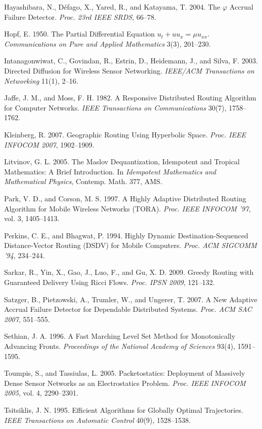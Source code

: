\documentclass[11pt]{article}
\theoremstyle{plain}
\numberwithin{equation}{section}
\begin{document}
Hayashibara, N., Défago, X., Yared, R., and Katayama, T. 2004. The $\varphi$ Accrual Failure Detector. \emph{Proc. 23rd IEEE SRDS}, 66–78.

Hopf, E. 1950. The Partial Differential Equation $u_t + u u_x = \mu u_{xx}$. \emph{Communications on Pure and Applied Mathematics} 3(3), 201–230.

Intanagonwiwat, C., Govindan, R., Estrin, D., Heidemann, J., and Silva, F. 2003. Directed Diffusion for Wireless Sensor Networking. \emph{IEEE/ACM Transactions on Networking} 11(1), 2–16.

Jaffe, J. M., and Moss, F. H. 1982. A Responsive Distributed Routing Algorithm for Computer Networks. \emph{IEEE Transactions on Communications} 30(7), 1758–1762.

Kleinberg, R. 2007. Geographic Routing Using Hyperbolic Space. \emph{Proc. IEEE INFOCOM 2007}, 1902–1909.

Litvinov, G. L. 2005. The Maslov Dequantization, Idempotent and Tropical Mathematics: A Brief Introduction. In \emph{Idempotent Mathematics and Mathematical Physics}, Contemp. Math. 377, AMS.

Park, V. D., and Corson, M. S. 1997. A Highly Adaptive Distributed Routing Algorithm for Mobile Wireless Networks (TORA). \emph{Proc. IEEE INFOCOM '97}, vol. 3, 1405–1413.

Perkins, C. E., and Bhagwat, P. 1994. Highly Dynamic Destination-Sequenced Distance-Vector Routing (DSDV) for Mobile Computers. \emph{Proc. ACM SIGCOMM '94}, 234–244.

Sarkar, R., Yin, X., Gao, J., Luo, F., and Gu, X. D. 2009. Greedy Routing with Guaranteed Delivery Using Ricci Flows. \emph{Proc. IPSN 2009}, 121–132.

Satzger, B., Pietzowski, A., Trumler, W., and Ungerer, T. 2007. A New Adaptive Accrual Failure Detector for Dependable Distributed Systems. \emph{Proc. ACM SAC 2007}, 551–555.

Sethian, J. A. 1996. A Fast Marching Level Set Method for Monotonically Advancing Fronts. \emph{Proceedings of the National Academy of Sciences} 93(4), 1591–1595.

Toumpis, S., and Tassiulas, L. 2005. Packetostatics: Deployment of Massively Dense Sensor Networks as an Electrostatics Problem. \emph{Proc. IEEE INFOCOM 2005}, vol. 4, 2290–2301.

Tsitsiklis, J. N. 1995. Efficient Algorithms for Globally Optimal Trajectories. \emph{IEEE Transactions on Automatic Control} 40(9), 1528–1538.
\end{document}
